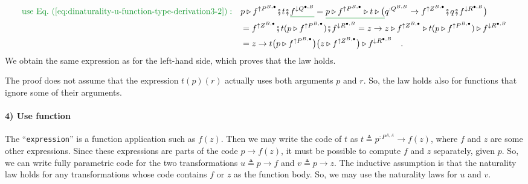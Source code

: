\begin{align*}
{\color{greenunder}\text{use Eq.~(\ref{eq:dinaturality-u-function-type-derivation3-2})}:}\quad & p\triangleright f^{\uparrow P^{B,\bullet}}\bef t\bef\gunderline{f^{\downarrow Q^{\bullet,B}}}=\gunderline{p\triangleright f^{\uparrow P^{B,\bullet}}\triangleright t\triangleright\big(}q^{:Q^{B,B}}\rightarrow f^{\uparrow Z^{B,\bullet}}\bef q\bef f^{\downarrow R^{\bullet,B}}\big)\\
 & =f^{\uparrow Z^{B,\bullet}}\bef t(p\triangleright f^{\uparrow P^{B,\bullet}})\bef f^{\downarrow R^{\bullet,B}}=z\rightarrow z\triangleright f^{\uparrow Z^{B,\bullet}}\triangleright t(p\triangleright f^{\uparrow P^{B,\bullet}})\triangleright f^{\downarrow R^{\bullet,B}}\\
 & =z\rightarrow t\big(p\triangleright f^{\uparrow P^{B,\bullet}}\big)\big(z\triangleright f^{\uparrow Z^{B,\bullet}}\big)\triangleright f^{\downarrow R^{\bullet,B}}\quad.
\end{align*}
We obtain the same expression as for the left-hand side, which proves
that the law holds.

The proof does not assume that the expression $t(p)(r)$ actually
uses both arguments $p$ and $r$. So, the law holds also for functions
that ignore some of their arguments.

\paragraph{4) Use function }

The \textsf{``}\lstinline!expression!\textsf{''} is a function application such as
$f(z)$. Then we may write the code of $t$ as $t\triangleq p^{:P^{A,A}}\rightarrow f(z)$,
where $f$ and $z$ are some other expressions. Since these expressions
are parts of the code $p\rightarrow f(z)$, it must be possible to
compute $f$ and $z$ separately, given $p$. So, we can write fully
parametric code for the two transformations $u\triangleq p\rightarrow f$
and $v\triangleq p\rightarrow z$. The inductive assumption is that
the naturality law holds for any transformations whose code contains
$f$ or $z$ as the function body. So, we may use the naturality laws
for $u$ and $v$.


